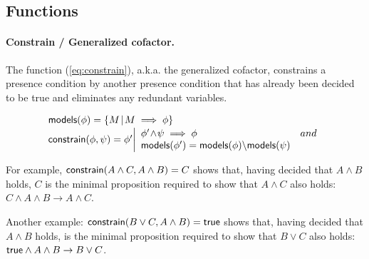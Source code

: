 \subsection{Functions}

\paragraph{Constrain / Generalized cofactor.} The  function (\ref{eq:constrain}), a.k.a. the generalized cofactor, constrains a presence condition \id{\phi} by another presence condition \id{\psi} that has already been decided to be true and eliminates any redundant variables.

\begin{equation}
\label{eq:constrain}
\begin{array}{l}
\textsf{models}(\phi) = \{ M \!\mid\! M \implies \phi \}
\\[0.5mm]
\textsf{constrain}(\phi,\psi) = \phi' \bigg|
	\begin{array}{lr}
	\phi' \!\land\! \psi \implies \phi & and \\
	\textsf{models}(\phi') = \textsf{models}(\phi) \backslash \textsf{models}(\psi) & 
	\end{array}
\end{array}
\end{equation}

For example, $\textsf{constrain}(A \land C, A \land B)=C$ shows that, having decided that $A \land B$ holds, $C$ is the minimal proposition required to show that $A \land C$ also holds: $C \land A \land B \to A \land C$.

Another example: $\textsf{constrain}(B \lor C, A \land B)=\textsf{true}$ shows that, having decided that $A \land B$ holds,  is the minimal proposition required to show that $B \lor C$ also holds: $\textsf{true} \land A \land B \to B \lor C$.
